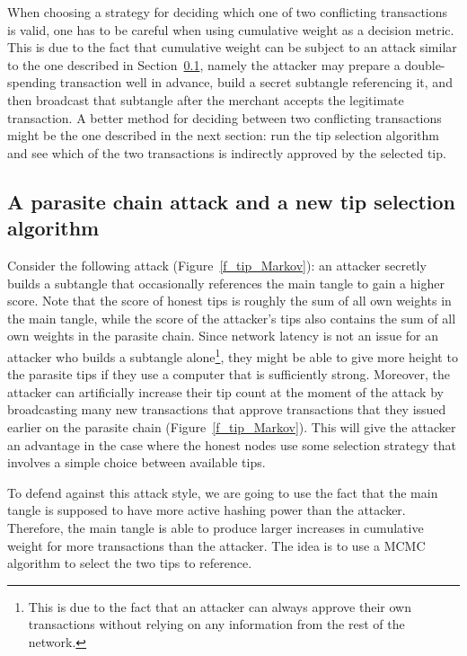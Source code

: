 \documentclass[12pt]{article}
\begin{document}
\begin{CJK}{UTF8}{bkai}
When choosing a strategy for deciding which one of 
two conflicting transactions is valid, one has to be careful 
when using cumulative weight as a decision metric. 
This is due to the fact that cumulative weight can be subject
 to an attack similar
to the one described
in Section~\ref{s_parasite}, namely the attacker may prepare 
a double-spending transaction well in advance, build a 
secret subtangle referencing it, and then broadcast 
that subtangle after the merchant accepts the legitimate 
transaction.  
A better method for deciding 
between two conflicting transactions might be the one
described in the next section: run the tip selection algorithm
and see which of the two transactions is indirectly
approved by the selected tip.

\subsection{A parasite chain attack and a new tip 
selection algorithm}
\label{s_parasite}
Consider the following attack (Figure~\ref{f_tip_Markov}):
an attacker secretly builds a subtangle that occasionally 
references the main tangle to gain a higher score. 
Note that the score of honest tips is roughly the sum 
of all own weights in the main tangle, while the score
of the attacker's tips also contains the sum of all own weights in the
parasite chain.
Since network latency is not an issue for an attacker
 who builds a subtangle 
alone\footnote{This is due to the fact that an attacker can always
approve their own transactions without relying on any
information from the rest of the network.},
they might be able to give more height
to the parasite tips if they use a computer 
that is sufficiently strong. Moreover, the attacker can artificially 
increase their tip count at the moment of the attack by 
broadcasting many new transactions that approve 
transactions that they issued earlier on the parasite chain
(Figure~\ref{f_tip_Markov}).
This will give the attacker an advantage in the case where 
the honest nodes use some selection strategy 
that involves a simple choice between available tips.

To defend against this attack style,
we are going to use the fact that the main tangle is supposed
to have more active hashing power than the attacker. Therefore, the 
main tangle is able to produce larger increases in cumulative weight 
for more transactions than the attacker.  
The idea is to use a MCMC algorithm
to select the two tips to reference. 


\end{CJK}
\end{document}
